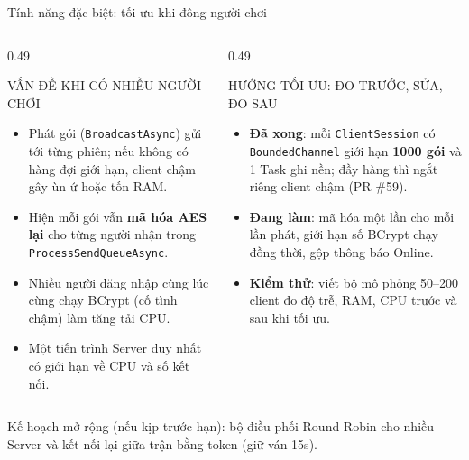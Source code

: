 \documentclass[aspectratio=169,9pt]{beamer}
\newenvironment{haicot}[1]{\begin{columns}[T,onlytextwidth]\begin{column}{#1\textwidth}}{\end{column}\end{columns}}
\newcommand{\sang}[1]{\end{column}\begin{column}{#1\textwidth}}
\begin{document}
\begin{frame}[t,label=dacbiet]{Tính năng đặc biệt: tối ưu khi đông người chơi}
  \begin{haicot}{0.49}
    \begin{khung}[equal height group=db]{VẤN ĐỀ KHI CÓ NHIỀU NGƯỜI CHƠI}
      \begin{itemize}\setlength{\itemsep}{1.5pt}
        \item Phát gói (\texttt{BroadcastAsync}) gửi tới từng phiên; nếu không có hàng đợi giới hạn, client chậm gây ùn ứ hoặc tốn RAM.
        \item Hiện mỗi gói vẫn \textbf{mã hóa AES lại} cho từng người nhận trong \texttt{ProcessSendQueueAsync}.
        \item Nhiều người đăng nhập cùng lúc cùng chạy BCrypt (cố tình chậm) làm tăng tải CPU.
        \item Một tiến trình Server duy nhất có giới hạn về CPU và số kết nối.
      \end{itemize}
    \end{khung}
  \sang{0.49}
    \begin{khung}[equal height group=db]{HƯỚNG TỐI ƯU: ĐO TRƯỚC, SỬA, ĐO SAU}
      \begin{itemize}\setlength{\itemsep}{1.5pt}
        \item \textbf{Đã xong}: mỗi \texttt{ClientSession} có \texttt{BoundedChannel} giới hạn \textbf{1000 gói} và 1 Task ghi nền; đầy hàng thì ngắt riêng client chậm (PR \#59).
        \item \textbf{Đang làm}: mã hóa một lần cho mỗi lần phát, giới hạn số BCrypt chạy đồng thời, gộp thông báo Online.
        \item \textbf{Kiểm thử}: viết bộ mô phỏng 50--200 client đo độ trễ, RAM, CPU trước và sau khi tối ưu.
      \end{itemize}
    \end{khung}
  \end{haicot}
  \begin{ketluan}
    Kế hoạch mở rộng (nếu kịp trước hạn): bộ điều phối Round-Robin cho nhiều Server và kết nối lại giữa trận bằng token (giữ ván 15s).
  \end{ketluan}
\end{frame}
\end{document}
